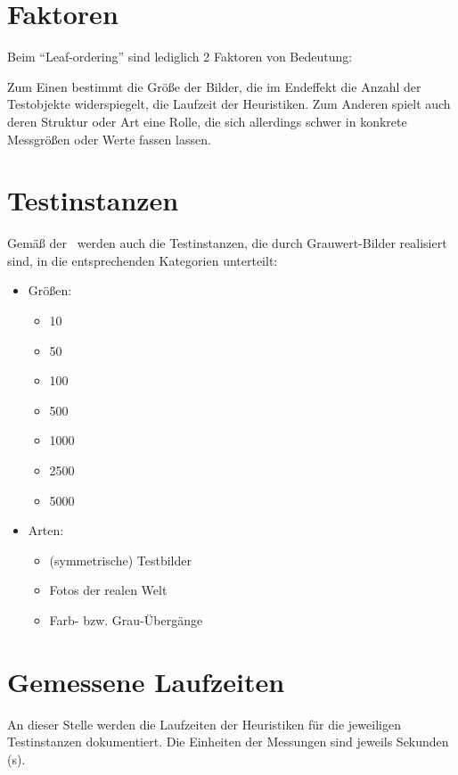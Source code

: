 \documentclass[a4paper, 10pt, twoside, onecolumn, parskip]{scrartcl}
\begin{document}
    \section{Faktoren} \label{sec:faktoren}

    Beim \enquote{Leaf-ordering} sind lediglich 2 Faktoren von Bedeutung:

    Zum Einen bestimmt die Größe der Bilder, die im Endeffekt die Anzahl der Testobjekte widerspiegelt, die Laufzeit der Heuristiken.
    Zum Anderen spielt auch deren Struktur oder Art eine Rolle, die sich allerdings schwer in konkrete Messgrößen oder Werte fassen lassen.

    \section{Testinstanzen} \label{sec:testinstanzen}

    Gemäß der~ werden auch die Testinstanzen, die durch Grauwert-Bilder realisiert sind, in die entsprechenden Kategorien unterteilt:
    \begin{itemize}
        \item Größen:
        \begin{itemize}
            \item 10
            \item 50
            \item 100
            \item 500
            \item 1000
            \item 2500
            \item 5000
        \end{itemize}
        \newpage
        \item Arten:
        \begin{itemize}
            \item (symmetrische) Testbilder
            \item Fotos der realen Welt
            \item Farb- bzw. Grau-Übergänge
        \end{itemize}
    \end{itemize}

    \section{Gemessene Laufzeiten} \label{sec:laufzeiten}
    An dieser Stelle werden die Laufzeiten der Heuristiken für die jeweiligen Testinstanzen dokumentiert.
    Die Einheiten der Messungen sind jeweils Sekunden (s).
\end{document}
